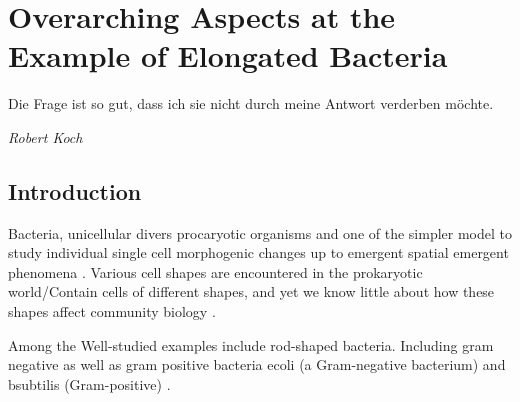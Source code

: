 \chapter{Overarching Aspects at the Example of Elongated Bacteria}
\label{chapter:overaching-aspects-elongated-bacteria}

\epigraph{Die Frage ist so gut, dass ich sie nicht durch meine Antwort verderben möchte.}
{\textit{Robert Koch}}


\section{Introduction}

Bacteria, unicellular divers procaryotic organisms and one of the simpler model to study
individual single cell morphogenic changes up to emergent spatial emergent phenomena
\cite{Vollmer2001}.
Various cell shapes are encountered in the prokaryotic world/Contain cells of different
shapes, and yet we know little about how these shapes affect community biology \cite{Smith2017}.

Among the Well-studied examples include rod-shaped bacteria. Including gram negative as
well as gram positive bacteria \ac{ecoli} (a Gram-negative bacterium) and \ac{bsubtilis}
(Gram-positive) \cite{Chang2014}.

